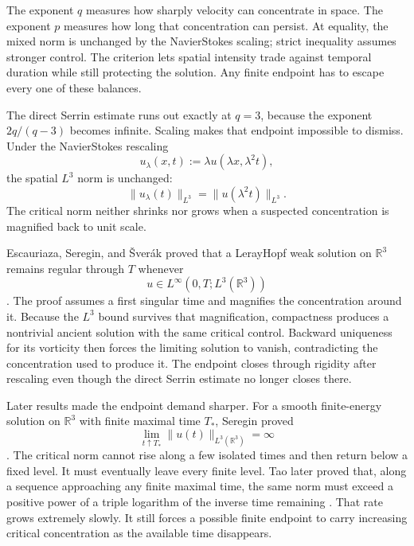 The exponent \(q\) measures how sharply velocity can concentrate in space.
The exponent \(p\) measures how long that concentration can persist.
At equality, the mixed norm is unchanged by the Navier\textendash Stokes scaling; strict inequality assumes stronger control.
The criterion lets spatial intensity trade against temporal duration while still protecting the solution.
Any finite endpoint has to escape every one of these balances.


The direct Serrin estimate runs out exactly at \(q=3\), because the exponent \(2q/(q-3)\) becomes infinite.
Scaling makes that endpoint impossible to dismiss.
Under the Navier\textendash Stokes rescaling
\begin{equation}\label{eq:HistoricalNavierStokesScaling}
  u_\lambda(x,t)
  :=
  \lambda u(\lambda x,\lambda^2t),
\end{equation}
the spatial \(L^3\) norm is unchanged:
\[
  \lVert u_\lambda(t)\rVert_{L^3}
  =
  \lVert u(\lambda^2t)\rVert_{L^3}.
\]
The critical norm neither shrinks nor grows when a suspected concentration is magnified back to unit scale.

Escauriaza, Seregin, and \v{S}ver{\'a}k proved that a Leray\textendash Hopf weak solution on \(\mathbb R^3\) remains regular through \(T\) whenever
\[
  u\in L^\infty(0,T;L^3(\mathbb R^3))
\]
\parencite{EscauriazaSereginSverak2003}.
The proof assumes a first singular time and magnifies the concentration around it.
Because the \(L^3\) bound survives that magnification, compactness produces a nontrivial ancient solution with the same critical control.
Backward uniqueness for its vorticity then forces the limiting solution to vanish, contradicting the concentration used to produce it.
The endpoint closes through rigidity after rescaling even though the direct Serrin estimate no longer closes there.

Later results made the endpoint demand sharper.
For a smooth finite-energy solution on \(\mathbb R^3\) with finite maximal time \(T_*\), Seregin proved
\begin{equation}\label{eq:SereginLThreeDivergence}
  \lim_{t\uparrow T_*}\lVert u(t)\rVert_{L^3(\mathbb R^3)}
  =\infty
\end{equation}
\parencite{Seregin2012}.
The critical norm cannot rise along a few isolated times and then return below a fixed level.
It must eventually leave every finite level.
Tao later proved that, along a sequence approaching any finite maximal time, the same norm must exceed a positive power of a triple logarithm of the inverse time remaining \parencite{Tao2021Quantitative}.
That rate grows extremely slowly.
It still forces a possible finite endpoint to carry increasing critical concentration as the available time disappears.

